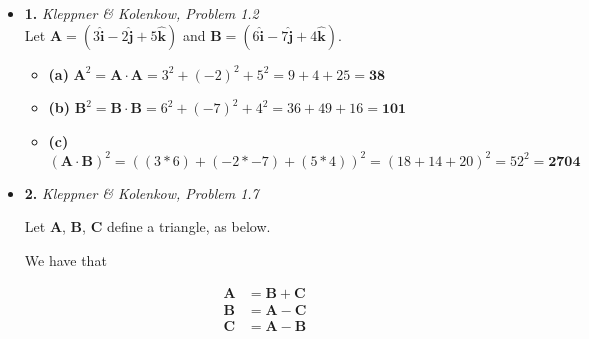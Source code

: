 \documentclass[tikz, 12pt,twoside]{article}
\begin{document}

\begin{itemize}
\item \textbf{1.} \emph{Kleppner \& Kolenkow, Problem 1.2} \\ \vspace{5mm}
  Let $\mathbf{A} = (3\mathbf{\hat{i}} - 2\mathbf{\hat{j}} + 5\mathbf{\hat{k}})$ and $\mathbf{B} = (6\mathbf{\hat{i}} - 7\mathbf{\hat{j}} + 4\mathbf{\hat{k}})$.
  \begin{itemize}
  \item \textbf{(a)}
    $\mathbf{A}^{2} = \mathbf{A} \cdot \mathbf{A} = 3^{2} + (-2)^{2} + 5^{2} = 9 + 4 + 25 = \mathbf{38}$
  \item \textbf{(b)}
    $\mathbf{B}^{2} = \mathbf{B} \cdot \mathbf{B} = 6^{2} + (-7)^{2} + 4^{2} = 36 + 49 + 16 = \mathbf{101}$
  \item \textbf{(c)}
    $(\mathbf{A}\cdot\mathbf{B})^{2} = \left((3*6) + (-2*-7) + (5*4)\right)^{2} = (18 + 14 + 20)^{2} = 52^{2} = \mathbf{2704}$
  \end{itemize}

\item \textbf{2.} \emph{Kleppner \& Kolenkow, Problem 1.7} \\ \vspace{5mm}

  Let $\mathbf{A}$, $\mathbf{B}$, $\mathbf{C}$ define a triangle, as below.
  \begin{figure}[H]
    \centering
  \end{figure}

  We have that

  \begin{align*}
    \mathbf{A} &= \mathbf{B} + \mathbf{C} \\
    \mathbf{B} &= \mathbf{A} - \mathbf{C} \\
    \mathbf{C} &= \mathbf{A} - \mathbf{B} \\
  \end{align*}


\end{itemize}
\end{document}
